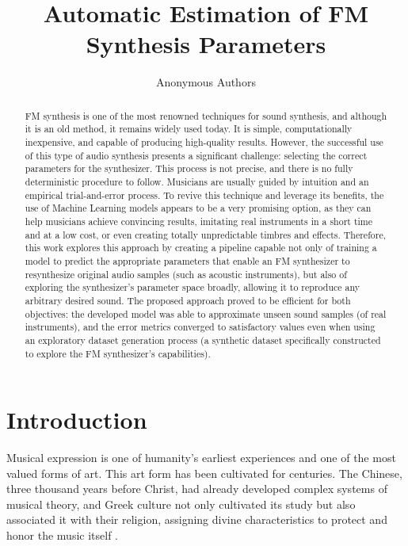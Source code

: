 \documentclass[10pt,conference]{IEEEtran}
\title{\LARGE \bf
Automatic Estimation of FM Synthesis Parameters
}
\begin{document}
\author{Anonymous Authors}

\maketitle
\thispagestyle{empty}
\pagestyle{empty}


\begin{abstract}
FM synthesis is one of the most renowned techniques for sound synthesis, and although it is an old method, it remains widely used today. It is simple, computationally inexpensive, and capable of producing high-quality results. However, the successful use of this type of audio synthesis presents a significant challenge: selecting the correct parameters for the synthesizer. This process is not precise, and there is no fully deterministic procedure to follow. Musicians are usually guided by intuition and an empirical trial-and-error process. To revive this technique and leverage its benefits, the use of Machine Learning models appears to be a very promising option, as they can help musicians achieve convincing results, imitating real instruments in a short time and at a low cost, or even creating totally unpredictable timbres and effects. Therefore, this work explores this approach by creating a pipeline capable not only of training a model to predict the appropriate parameters that enable an FM synthesizer to resynthesize original audio samples (such as acoustic instruments), but also of exploring the synthesizer’s parameter space broadly, allowing it to reproduce any arbitrary desired sound. The proposed approach proved to be efficient for both objectives: the developed model was able to approximate unseen sound samples (of real instruments), and the error metrics converged to satisfactory values even when using an exploratory dataset generation process (a synthetic dataset specifically constructed to explore the FM synthesizer’s capabilities).
\end{abstract}


\section{Introduction}

Musical expression is one of humanity’s earliest experiences and one of the most valued forms of art. This art form has been cultivated for centuries. The Chinese, three thousand years before Christ, had already developed complex systems of musical theory, and Greek culture not only cultivated its study but also associated it with their religion, assigning divine characteristics to protect and honor the music itself \cite{med1996teoria}.
\end{document}
